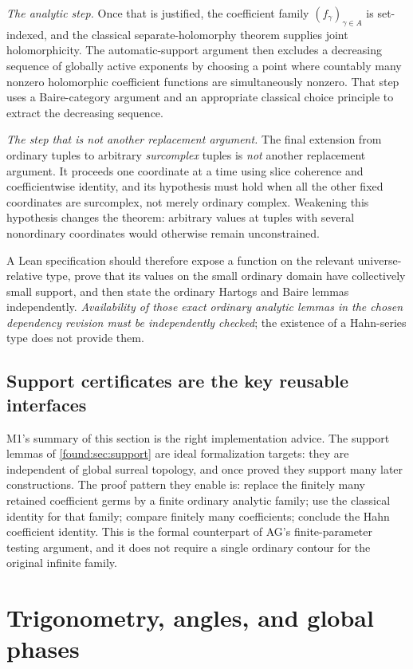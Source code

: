 \documentclass[11pt,letterpaper]{article}
\numberwithin{equation}{section}
\theoremstyle{definition}
\theoremstyle{remark}
\begin{document}
\emph{The analytic step.} Once that is justified, the coefficient family
$(f_\gamma)_{\gamma\in A}$ is set-indexed, and the classical
separate-holomorphy theorem supplies joint holomorphicity. The automatic-support
argument then excludes a decreasing sequence of globally active exponents by
choosing a point where countably many nonzero holomorphic coefficient functions
are simultaneously nonzero. That step uses a Baire-category argument and an
appropriate classical choice principle to extract the decreasing sequence.

\emph{The step that is not another replacement argument.} The final extension
from ordinary tuples to arbitrary \emph{surcomplex} tuples is \emph{not} another
replacement argument. It proceeds one coordinate at a time using slice coherence
and coefficientwise identity, and its hypothesis must hold when all the other
fixed coordinates are surcomplex, not merely ordinary complex. Weakening this
hypothesis changes the theorem: arbitrary values at tuples with several
nonordinary coordinates would otherwise remain unconstrained.

A Lean specification should therefore expose a function on the relevant
universe-relative type, prove that its values on the small ordinary domain have
collectively small support, and then state the ordinary Hartogs and Baire lemmas
independently. \emph{Availability of those exact ordinary analytic lemmas in the
chosen dependency revision must be independently checked}; the existence of a
Hahn-series type does not provide them.

\subsection{Support certificates are the key reusable interfaces}
\label{found:sub:supportcertificates}
M1's summary of this section is the right implementation advice. The support
lemmas of \cref{found:sec:support} are ideal formalization targets: they are
independent of global surreal topology, and once proved they support many later
constructions. The proof pattern they enable is: replace the finitely many
retained coefficient germs by a finite ordinary analytic family; use the
classical identity for that family; compare finitely many coefficients; conclude
the Hahn coefficient identity. This is the formal counterpart of AG's
finite-parameter testing argument, and it does not require a single ordinary
contour for the original infinite family.

\section{Trigonometry, angles, and global phases}
\label{found:sec:trigonometry}
\end{document}

